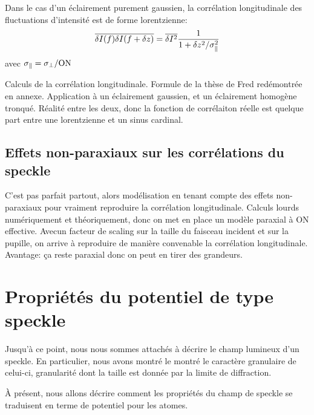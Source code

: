 Dans le cas d'un éclairement purement gaussien, la corrélation longitudinale des fluctuations d'intensité est de forme lorentzienne:
\begin{equation}
\overline{\delta I(f) \delta I(f+\delta z)} = \overline{\delta I^2} \frac{1}{1+\delta z^2 / \sigma_{\parallel}^2}
\end{equation}
avec $\sigma_{\parallel}=\sigma_{\perp}/\mathrm{ON}$



Calculs de la corrélation longitudinale. Formule de la thèse de Fred redémontrée en annexe. Application à un éclairement gaussien, et un éclairement homogène tronqué. Réalité entre les deux, donc la fonction de corrélaiton réelle est quelque part entre une lorentzienne et un sinus cardinal. 





\subsection{Effets non-paraxiaux sur les corrélations du speckle}
\label{sc:speckle_non_paraxial}
C'est pas parfait partout, alors modélisation en tenant compte des effets non-paraxiaux pour vraiment reproduire la corrélation longitudinale. Calculs lourds numériquement et théoriquement, donc on met en place un modèle paraxial à ON effective. Avecun facteur de scaling sur la taille du faisceau incident et sur la pupille, on arrive à reproduire de manière convenable la corrélation longitudinale. Avantage: ça reste paraxial donc on peut en tirer des grandeurs. 






\section{Propriétés du potentiel de type speckle}
\label{sc:potentiel_speckle}
Jusqu'à ce point, nous nous sommes attachés à décrire le champ lumineux d'un speckle. En particulier, nous avons montré le montré le caractère granulaire de celui-ci, granularité dont la taille est donnée par la limite de diffraction. 

À présent, nous allons décrire comment les propriétés du champ de speckle se traduisent en terme de potentiel pour les atomes. 

